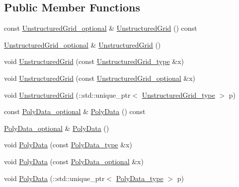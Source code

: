 \subsection*{Public Member Functions}
\begin{DoxyCompactItemize}
\item 
const \hyperlink{classVTKFile__t_ada5bb5a706e03ef1ab2ed1513ea83833}{Unstructured\+Grid\+\_\+optional} \& \hyperlink{classVTKFile__t_a118852d8ec1f8039d1fd5c914282351a}{Unstructured\+Grid} () const 
\item 
\hyperlink{classVTKFile__t_ada5bb5a706e03ef1ab2ed1513ea83833}{Unstructured\+Grid\+\_\+optional} \& \hyperlink{classVTKFile__t_aa4746d4a723076d4643b8ef16a9c3890}{Unstructured\+Grid} ()
\item 
void \hyperlink{classVTKFile__t_a2c2b1b2ff487c7e61bcd2875db8747be}{Unstructured\+Grid} (const \hyperlink{classVTKFile__t_a34ea02f6804e701657f11a8dc3851951}{Unstructured\+Grid\+\_\+type} \&x)
\item 
void \hyperlink{classVTKFile__t_ae33d9781bddb747f9255570b1af2dfeb}{Unstructured\+Grid} (const \hyperlink{classVTKFile__t_ada5bb5a706e03ef1ab2ed1513ea83833}{Unstructured\+Grid\+\_\+optional} \&x)
\item 
void \hyperlink{classVTKFile__t_aa0971069bdc8c87a2b5b90f4e50dce3c}{Unstructured\+Grid} (\+::std\+::unique\+\_\+ptr$<$ \hyperlink{classVTKFile__t_a34ea02f6804e701657f11a8dc3851951}{Unstructured\+Grid\+\_\+type} $>$ p)
\item 
const \hyperlink{classVTKFile__t_aacb796775ae228cd61726a23b809f3e4}{Poly\+Data\+\_\+optional} \& \hyperlink{classVTKFile__t_a7d728d7f31157fc80117c2f80978344c}{Poly\+Data} () const 
\item 
\hyperlink{classVTKFile__t_aacb796775ae228cd61726a23b809f3e4}{Poly\+Data\+\_\+optional} \& \hyperlink{classVTKFile__t_a0f87118c1898bc43619fa0bade52e921}{Poly\+Data} ()
\item 
void \hyperlink{classVTKFile__t_ab0a3f2aa2894d0384a89a6e5490c9372}{Poly\+Data} (const \hyperlink{classVTKFile__t_a4588b4f0e28ba09aa219bda7e1fc6c97}{Poly\+Data\+\_\+type} \&x)
\item 
void \hyperlink{classVTKFile__t_a1c2a800d41431c04965c863220a3b1b5}{Poly\+Data} (const \hyperlink{classVTKFile__t_aacb796775ae228cd61726a23b809f3e4}{Poly\+Data\+\_\+optional} \&x)
\item 
void \hyperlink{classVTKFile__t_a3d4840c857ac2cc511849d537b003020}{Poly\+Data} (\+::std\+::unique\+\_\+ptr$<$ \hyperlink{classVTKFile__t_a4588b4f0e28ba09aa219bda7e1fc6c97}{Poly\+Data\+\_\+type} $>$ p)

\end{DoxyCompactItemize}
